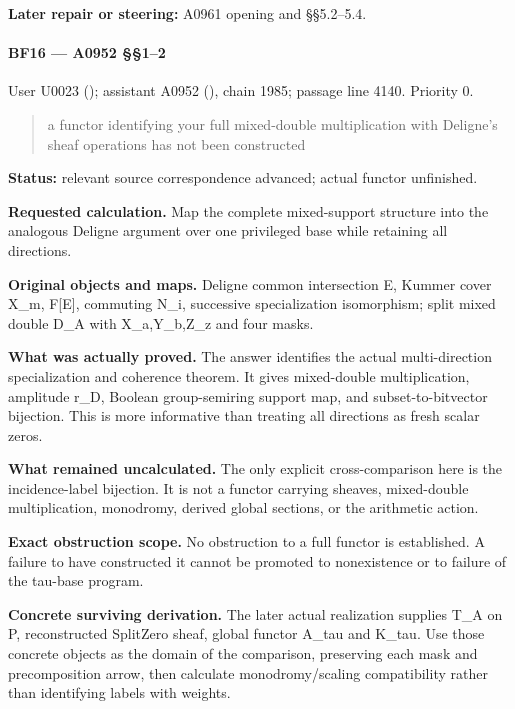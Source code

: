 \textbf{Later repair or steering:} A0961 opening and §§5.2--5.4.

\paragraph{BF16 --- A0952 §§1--2}\label{bf16-a0952-12}

User U0023 (\protect{});
assistant A0952 (\protect{}),
chain 1985; passage line 4140. Priority 0.

\begin{quote}
a functor identifying your full mixed-double multiplication with
Deligne's sheaf operations has not been constructed
\end{quote}

\textbf{Status:} relevant source correspondence advanced; actual functor
unfinished.

\textbf{Requested calculation.} Map the complete mixed-support structure
into the analogous Deligne argument over one privileged base while
retaining all directions.

\textbf{Original objects and maps.} Deligne common intersection E,
Kummer cover X\_m, F{[}E{]}, commuting N\_i, successive specialization
isomorphism; split mixed double D\_A with X\_a,Y\_b,Z\_z and four masks.

\textbf{What was actually proved.} The answer identifies the actual
multi-direction specialization and coherence theorem. It gives
mixed-double multiplication, amplitude r\_D, Boolean group-semiring
support map, and subset-to-bitvector bijection. This is more informative
than treating all directions as fresh scalar zeros.

\textbf{What remained uncalculated.} The only explicit cross-comparison
here is the incidence-label bijection. It is not a functor carrying
sheaves, mixed-double multiplication, monodromy, derived global
sections, or the arithmetic action.

\textbf{Exact obstruction scope.} No obstruction to a full functor is
established. A failure to have constructed it cannot be promoted to
nonexistence or to failure of the tau-base program.

\textbf{Concrete surviving derivation.} The later actual realization
supplies T\_A on P, reconstructed SplitZero sheaf, global functor A\_tau
and K\_tau. Use those concrete objects as the domain of the comparison,
preserving each mask and precomposition arrow, then calculate
monodromy/scaling compatibility rather than identifying labels with
weights.

